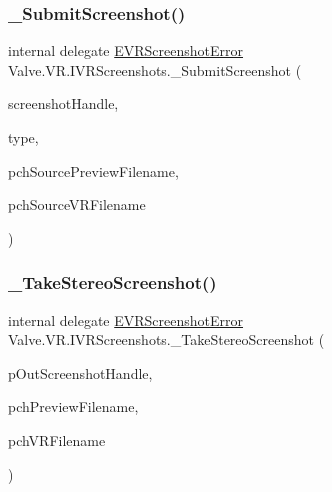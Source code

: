 \mbox{\label{struct_valve_1_1_v_r_1_1_i_v_r_screenshots_aa0b6789713552885537583e9ca318010}} 
\subsubsection{\texorpdfstring{\_SubmitScreenshot()}{\_SubmitScreenshot()}}
{\footnotesize\ttfamily internal delegate \mbox{\hyperlink{namespace_valve_1_1_v_r_ac73c6dcb1af8fe045a626296a21e226b}{E\+V\+R\+Screenshot\+Error}} Valve.\+V\+R.\+I\+V\+R\+Screenshots.\+\_\+\+Submit\+Screenshot (\begin{DoxyParamCaption}\item[{uint}]{screenshot\+Handle,  }\item[{\mbox{\hyperlink{namespace_valve_1_1_v_r_a033ac579445f0992130b11ba62c9b7ae}{E\+V\+R\+Screenshot\+Type}}}]{type,  }\item[{string}]{pch\+Source\+Preview\+Filename,  }\item[{string}]{pch\+Source\+V\+R\+Filename }\end{DoxyParamCaption})}

\mbox{\label{struct_valve_1_1_v_r_1_1_i_v_r_screenshots_ac9eb5e2fe44b9b5a3af94f18dee0dca0}} 
\subsubsection{\texorpdfstring{\_TakeStereoScreenshot()}{\_TakeStereoScreenshot()}}
{\footnotesize\ttfamily internal delegate \mbox{\hyperlink{namespace_valve_1_1_v_r_ac73c6dcb1af8fe045a626296a21e226b}{E\+V\+R\+Screenshot\+Error}} Valve.\+V\+R.\+I\+V\+R\+Screenshots.\+\_\+\+Take\+Stereo\+Screenshot (\begin{DoxyParamCaption}\item[{ref uint}]{p\+Out\+Screenshot\+Handle,  }\item[{string}]{pch\+Preview\+Filename,  }\item[{string}]{pch\+V\+R\+Filename }\end{DoxyParamCaption})}

